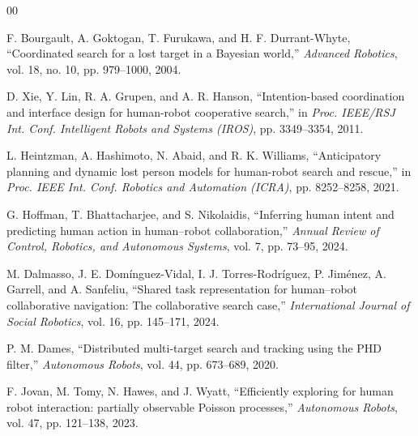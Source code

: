 \documentclass[conference]{IEEEtran}
\begin{document}
\begin{thebibliography}{00}

F. Bourgault, A. Goktogan, T. Furukawa, and H. F. Durrant-Whyte,
``Coordinated search for a lost target in a Bayesian world,''
\emph{Advanced Robotics}, vol. 18, no. 10, pp. 979--1000, 2004.

D. Xie, Y. Lin, R. A. Grupen, and A. R. Hanson,
``Intention-based coordination and interface design for human-robot cooperative
search,'' in \emph{Proc. IEEE/RSJ Int. Conf. Intelligent Robots and Systems
(IROS)}, pp. 3349--3354, 2011.

L. Heintzman, A. Hashimoto, N. Abaid, and R. K. Williams,
``Anticipatory planning and dynamic lost person models for human-robot search
and rescue,'' in \emph{Proc. IEEE Int. Conf. Robotics and Automation (ICRA)},
pp. 8252--8258, 2021.

G. Hoffman, T. Bhattacharjee, and S. Nikolaidis,
``Inferring human intent and predicting human action in human--robot
collaboration,'' \emph{Annual Review of Control, Robotics, and Autonomous
Systems}, vol. 7, pp. 73--95, 2024.

M. Dalmasso, J. E. Dom\'inguez-Vidal, I. J. Torres-Rodr\'iguez,
P. Jim\'enez, A. Garrell, and A. Sanfeliu,
``Shared task representation for human--robot collaborative navigation: The
collaborative search case,'' \emph{International Journal of Social Robotics},
vol. 16, pp. 145--171, 2024.

P. M. Dames,
``Distributed multi-target search and tracking using the PHD filter,''
\emph{Autonomous Robots}, vol. 44, pp. 673--689, 2020.

F. Jovan, M. Tomy, N. Hawes, and J. Wyatt,
``Efficiently exploring for human robot interaction: partially observable
Poisson processes,'' \emph{Autonomous Robots}, vol. 47, pp. 121--138, 2023.

\end{thebibliography}
\end{document}
